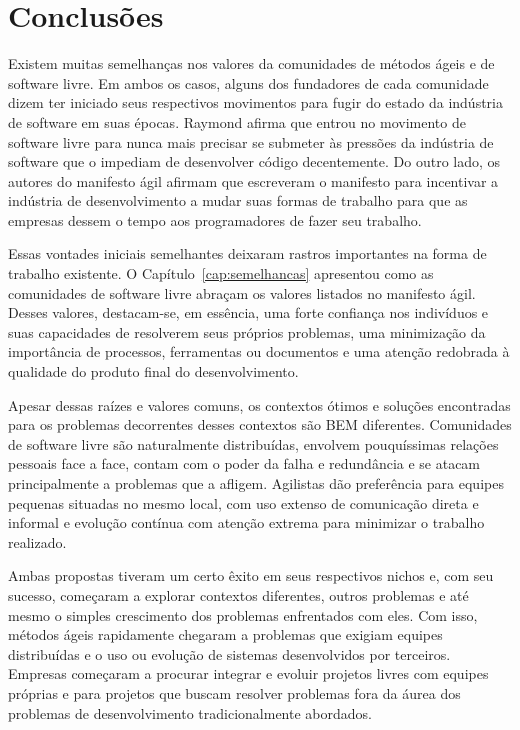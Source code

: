 \chapter{Conclusões}
\label{cap:conclusoes}


Existem muitas semelhanças nos valores da comunidades de métodos ágeis
e de software livre. Em ambos os casos, alguns dos fundadores de cada
comunidade dizem ter iniciado seus respectivos movimentos para fugir
do estado da indústria de software em suas épocas. Raymond afirma que
entrou no movimento de software livre para nunca mais precisar se
submeter às pressões da indústria de software que o impediam de
desenvolver código decentemente. Do outro lado, os autores do
manifesto ágil afirmam que escreveram o manifesto para incentivar a
indústria de desenvolvimento a mudar suas formas de trabalho para que
as empresas dessem o tempo aos programadores de fazer seu trabalho.

Essas vontades iniciais semelhantes deixaram rastros importantes na
forma de trabalho existente. O Capítulo~\ref{cap:semelhancas}
apresentou como as comunidades de software livre abraçam os valores
listados no manifesto ágil. Desses valores, destacam-se, em essência,
uma forte confiança nos indivíduos e suas capacidades de resolverem
seus próprios problemas, uma minimização da importância de processos,
ferramentas ou documentos e uma atenção redobrada à qualidade do
produto final do desenvolvimento.

Apesar dessas raízes e valores comuns, os contextos ótimos e soluções
encontradas para os problemas decorrentes desses contextos são BEM
diferentes. Comunidades de software livre são naturalmente
distribuídas, envolvem pouquíssimas relações pessoais face a face,
contam com o poder da falha e redundância e se atacam principalmente a
problemas que a afligem. Agilistas dão preferência para equipes
pequenas situadas no mesmo local, com uso extenso de comunicação
direta e informal e evolução contínua com atenção extrema para
minimizar o trabalho realizado.

Ambas propostas tiveram um certo êxito em seus respectivos nichos e,
com seu sucesso, começaram a explorar contextos diferentes, outros
problemas e até mesmo o simples crescimento dos problemas enfrentados
com eles. Com isso, métodos ágeis rapidamente chegaram a problemas que
exigiam equipes distribuídas e o uso ou evolução de sistemas
desenvolvidos por terceiros. Empresas começaram a procurar integrar e
evoluir projetos livres com equipes próprias e para projetos que
buscam resolver problemas fora da áurea dos problemas de
desenvolvimento tradicionalmente abordados.

